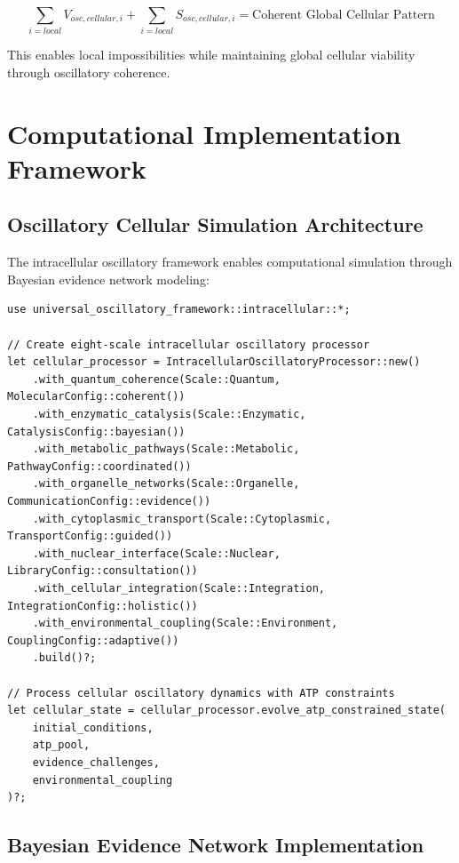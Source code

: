 \documentclass[12pt,a4paper]{article}
\begin{document}
{\begin{equation}
\sum_{i=local} V_{osc,cellular,i} + \sum_{i=local} S_{osc,cellular,i} = \text{Coherent Global Cellular Pattern}
\end{equation}

This enables local impossibilities while maintaining global cellular viability through oscillatory coherence.

\section{Computational Implementation Framework}

\subsection{Oscillatory Cellular Simulation Architecture}

The intracellular oscillatory framework enables computational simulation through Bayesian evidence network modeling:

\begin{verbatim}
use universal_oscillatory_framework::intracellular::*;

// Create eight-scale intracellular oscillatory processor
let cellular_processor = IntracellularOscillatoryProcessor::new()
    .with_quantum_coherence(Scale::Quantum, MolecularConfig::coherent())
    .with_enzymatic_catalysis(Scale::Enzymatic, CatalysisConfig::bayesian())
    .with_metabolic_pathways(Scale::Metabolic, PathwayConfig::coordinated())
    .with_organelle_networks(Scale::Organelle, CommunicationConfig::evidence())
    .with_cytoplasmic_transport(Scale::Cytoplasmic, TransportConfig::guided())
    .with_nuclear_interface(Scale::Nuclear, LibraryConfig::consultation())
    .with_cellular_integration(Scale::Integration, IntegrationConfig::holistic())
    .with_environmental_coupling(Scale::Environment, CouplingConfig::adaptive())
    .build()?;

// Process cellular oscillatory dynamics with ATP constraints
let cellular_state = cellular_processor.evolve_atp_constrained_state(
    initial_conditions,
    atp_pool,
    evidence_challenges,
    environmental_coupling
)?;
\end{verbatim}

\subsection{Bayesian Evidence Network Implementation}

}
\end{document}

